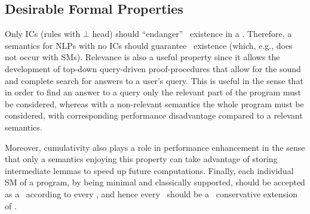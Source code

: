 \documentclass{llncs}
\begin{document}
		\subsection{Desirable Formal Properties}\label{subsec:desirableproperties}
			Only ICs (rules with $\bot$ head) should ``endanger'' \m\ existence in a \lp.
			Therefore, a semantics for NLPs with no ICs should guarantee \m\ existence (which, e.g., does not occur with SMs).
			Relevance is also a useful property since it allows the development of top-down query-driven proof-procedures that allow for the
			sound and complete search for answers to a user's query.
			This is useful in the sense that in order to find an answer to a query only the relevant part of the program must be considered, whereas
			with a non-relevant semantics 
the whole program must be considered, with corresponding performance disadvantage compared
			to a relevant semantics.
			
			
			Moreover, cumulativity also plays a role in performance enhancement in the sense that only a semantics enjoying this property can take 
			advantage of storing intermediate lemmas to speed up future computations.
			Finally, each individual SM of a program, by being minimal and classically supported, should be accepted as a \m\ according to
			every \twovs, and hence every \twovs\ should be a \m\ conservative extension of \SMs.
\end{document}
